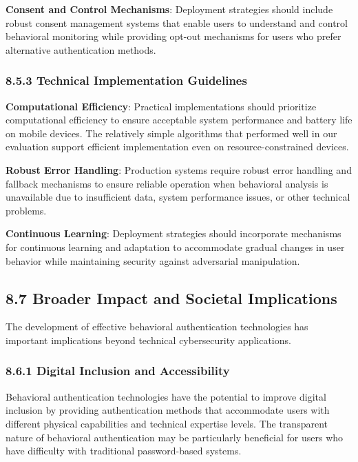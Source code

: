 \documentclass[
  11pt,
  a4paper,
]{article}
\begin{document}
\textbf{Consent and Control Mechanisms}: Deployment strategies should
include robust consent management systems that enable users to
understand and control behavioral monitoring while providing opt-out
mechanisms for users who prefer alternative authentication methods.

\subsubsection{8.5.3 Technical Implementation
Guidelines}\label{technical-implementation-guidelines}

\textbf{Computational Efficiency}: Practical implementations should
prioritize computational efficiency to ensure acceptable system
performance and battery life on mobile devices. The relatively simple
algorithms that performed well in our evaluation support efficient
implementation even on resource-constrained devices.

\textbf{Robust Error Handling}: Production systems require robust error
handling and fallback mechanisms to ensure reliable operation when
behavioral analysis is unavailable due to insufficient data, system
performance issues, or other technical problems.

\textbf{Continuous Learning}: Deployment strategies should incorporate
mechanisms for continuous learning and adaptation to accommodate gradual
changes in user behavior while maintaining security against adversarial
manipulation.

\subsection{8.7 Broader Impact and Societal
Implications}\label{broader-impact-and-societal-implications}

The development of effective behavioral authentication technologies has
important implications beyond technical cybersecurity applications.

\subsubsection{8.6.1 Digital Inclusion and
Accessibility}\label{digital-inclusion-and-accessibility}

Behavioral authentication technologies have the potential to improve
digital inclusion by providing authentication methods that accommodate
users with different physical capabilities and technical expertise
levels. The transparent nature of behavioral authentication may be
particularly beneficial for users who have difficulty with traditional
password-based systems.
\end{document}
